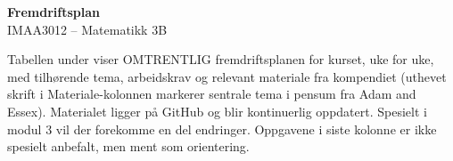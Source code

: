 \documentclass[10pt,a4paper]{article}
\begin{document}
\begin{center}
{\Large\bfseries Fremdriftsplan}\\[.3em]
{\large IMAA3012 -- Matematikk 3B}
\end{center}
\vspace{.6em}

Tabellen under viser OMTRENTLIG fremdriftsplanen for kurset, uke for uke, med tilhørende tema, arbeidskrav og relevant materiale fra kompendiet (uthevet skrift i Materiale-kolonnen markerer sentrale tema i pensum fra Adam and Essex). Materialet ligger på GitHub og blir kontinuerlig oppdatert. Spesielt i modul 3 vil der forekomme en del endringer. Oppgavene i siste kolonne er ikke spesielt anbefalt, men ment som orientering.

\begingroup
\scriptsize
\setlength{\tabcolsep}{3pt}
\renewcommand{\arraystretch}{1.1}
\end{document}
